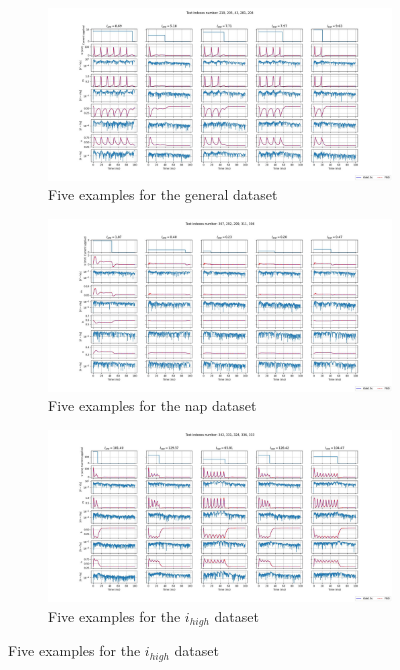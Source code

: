 \documentclass{article}
\begin{document}
\begin{center}
    \begin{figure}
        \begin{subfigure}{.5\textwidth}
            \centering
            \includegraphics[width=1.8\linewidth]{images/general_error_HH.jpg}
            \caption{Five examples for the general dataset}
            \label{HH_err_general}
        \end{subfigure}

        \begin{subfigure}{.5\textwidth}
            \centering
            \includegraphics[width=1.8\linewidth]{images/nap_error_HH.jpg}
            \caption{Five examples for the nap dataset}
            \label{HH_err_nap}
        \end{subfigure}

        \begin{subfigure}{.5\textwidth}
            \centering
            \includegraphics[width=1.8\linewidth]{images/high_i_error_HH.jpg}
            \caption{Five examples for the $i_{high}$ dataset}
            \label{HH_err_i_high}
        \end{subfigure}
    \end{figure}
\end{center}
\end{document}
